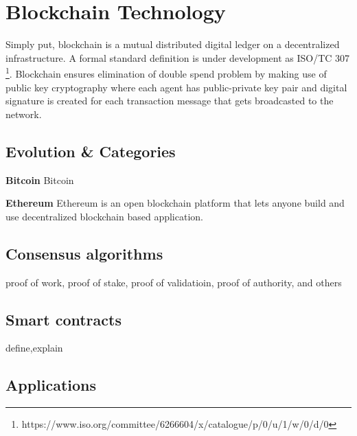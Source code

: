 
\section{Blockchain Technology}
Simply put, blockchain is a mutual distributed digital ledger on a 
decentralized infrastructure. A formal standard definition is under 
development as ISO/TC 307
\footnote{https://www.iso.org/committee/6266604/x/catalogue/p/0/u/1/w/0/d/0}. 
Blockchain ensures elimination of double spend problem by making use of 
public key cryptography where each agent has public-private key pair and 
digital signature is created for each transaction message that gets 
broadcasted to the network. 
\cite{pilkington201611}


\subsection{Evolution \& Categories}
\textbf{Bitcoin}
Bitcoin 


\textbf{Ethereum}
Ethereum is an open blockchain platform that lets anyone build and use 
decentralized blockchain based application. 
\cite{buterin2013ethereum} 




\subsection{Consensus algorithms}
proof of work, proof of stake, proof of validatioin, proof of authority, and others


\subsection{Smart contracts}
define,explain
\subsection{Applications}




